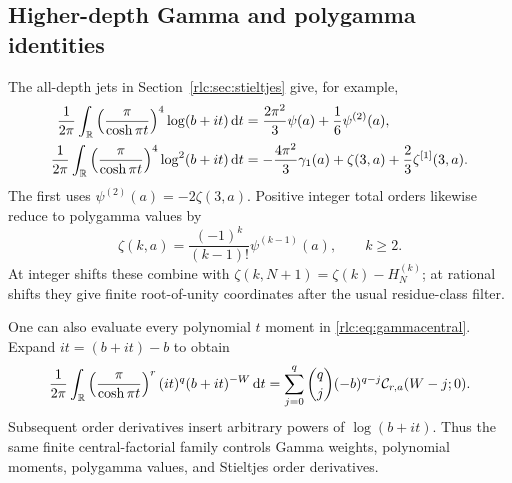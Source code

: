 \subsection{Higher-depth Gamma and polygamma identities}
The all-depth jets in Section~\ref{rlc:sec:stieltjes} give, for example,
\begin{align}
 \frac1{2\pi}\int_\mathbb R
 \left(\frac\pi{\cosh\pi t}\right)^4\log(b+it)\,\mathrm d t
 &=\frac{2\pi^2}{3}\psi(a)+\frac16\psi^{(2)}(a),
 \label{rlc:eq:gamma4log}\\
 \frac1{2\pi}\int_\mathbb R
 \left(\frac\pi{\cosh\pi t}\right)^4\log^2(b+it)\,\mathrm d t
 &=-\frac{4\pi^2}{3}\gamma_1(a)
     +\zeta(3,a)+\frac23\zeta^{[1]}(3,a).
 \label{rlc:eq:gamma4log2}
\end{align}
The first uses $\psi^{(2)}(a)=-2\zeta(3,a)$.
Positive integer total orders likewise reduce to polygamma values by
\[
 \zeta(k,a)=\frac{(-1)^k}{(k-1)!}\psi^{(k-1)}(a),\qquad k\ge2.
\]
At integer shifts these combine with
$\zeta(k,N+1)=\zeta(k)-H_N^{(k)}$; at rational shifts they give finite
root-of-unity coordinates after the usual residue-class filter.

One can also evaluate every polynomial $t$ moment in
\eqref{rlc:eq:gammacentral}. Expand
$it=(b+it)-b$ to obtain
\begin{equation}\label{rlc:eq:tGamma}
 \frac1{2\pi}\int_\mathbb R
 \left(\frac\pi{\cosh\pi t}\right)^r(it)^q(b+it)^{-W}\,\mathrm d t
 =\sum_{j=0}^{q}\binom qj(-b)^{q-j}\mathcal C_{r,a}(W-j;0).
\end{equation}
Subsequent order derivatives insert arbitrary powers of $\log(b+it)$.
Thus the same finite central-factorial family controls Gamma weights,
polynomial moments, polygamma values, and Stieltjes order derivatives.
